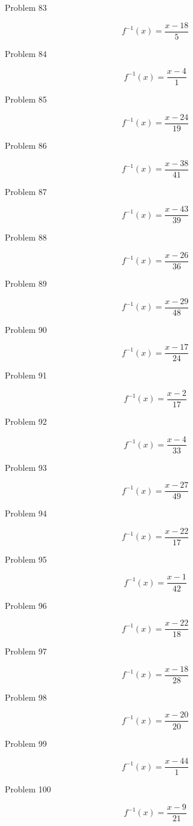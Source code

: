 \documentclass{article}
\begin{document}
Problem 83

\[
f^{-1}(x) = \frac{x - 18}{5}
\]

Problem 84

\[
f^{-1}(x) = \frac{x - 4}{1}
\]

Problem 85

\[
f^{-1}(x) = \frac{x - 24}{19}
\]

Problem 86

\[
f^{-1}(x) = \frac{x - 38}{41}
\]

Problem 87

\[
f^{-1}(x) = \frac{x - 43}{39}
\]

Problem 88

\[
f^{-1}(x) = \frac{x - 26}{36}
\]

Problem 89

\[
f^{-1}(x) = \frac{x - 29}{48}
\]

Problem 90

\[
f^{-1}(x) = \frac{x - 17}{24}
\]

Problem 91

\[
f^{-1}(x) = \frac{x - 2}{17}
\]

Problem 92

\[
f^{-1}(x) = \frac{x - 4}{33}
\]

Problem 93

\[
f^{-1}(x) = \frac{x - 27}{49}
\]

Problem 94

\[
f^{-1}(x) = \frac{x - 22}{17}
\]

Problem 95

\[
f^{-1}(x) = \frac{x - 1}{42}
\]

Problem 96

\[
f^{-1}(x) = \frac{x - 22}{18}
\]

Problem 97

\[
f^{-1}(x) = \frac{x - 18}{28}
\]

Problem 98

\[
f^{-1}(x) = \frac{x - 20}{20}
\]

Problem 99

\[
f^{-1}(x) = \frac{x - 44}{1}
\]

Problem 100

\[
f^{-1}(x) = \frac{x - 9}{21}
\]
\end{document}
